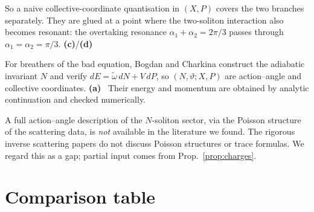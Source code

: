 \documentclass[11pt,a4paper]{article}
\newcommand{\La}{\textsf{\textbf{(a)}}}
\newcommand{\Lc}{\textsf{\textbf{(c)}}}
\newcommand{\Ld}{\textsf{\textbf{(d)}}}
\theoremstyle{remark}
\begin{document}
So a naive collective-coordinate quantisation in $(X,P)$ covers the two branches separately. They are glued at a point where the two-soliton interaction also becomes resonant: the overtaking resonance $\alpha_1+\alpha_2=2\pi/3$ passes through $\alpha_1=\alpha_2=\pi/3$. \Lc/\Ld

For breathers of the bad equation, Bogdan and Charkina construct the adiabatic invariant $N$ and verify $dE=\tilde\omega\,dN+V\,dP$, so $(N,\vartheta;X,P)$ are action--angle and collective coordinates. \La~\cite[(64)--(71)]{BC} Their energy and momentum are obtained by analytic continuation and checked numerically.

A full action--angle description of the $N$-soliton sector, via the Poisson structure of the scattering data, is \emph{not} available in the literature we found. The rigorous inverse scattering papers do not discuss Poisson structures or trace formulas. We regard this as a gap; partial input comes from Prop.~\ref{prop:charges}.

\section{Comparison table}\label{sec:table}
\end{document}
